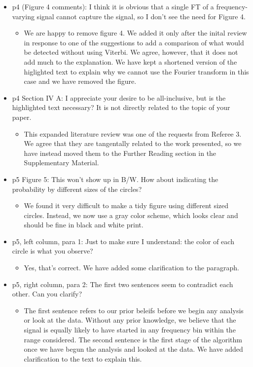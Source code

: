 \documentclass[a4paper, 10pt]{letter}
\begin{document}
\begin{itemize}
\item p4 (Figure 4 comments):  I think it is obvious that a single FT of a frequency-varying signal cannot capture the signal, so I don't see the need for Figure 4. 
\begin{itemize}
\item We are happy to remove figure 4. We added it only after the inital review in response to one of the suggestions to add a comparison of what would be detected without using Viterbi. We agree, however, that it does not add much to the explanation. We have kept a shortened version of the higlighted text to explain why we cannot use the Fourier transform in this case and we have removed the figure. 
\end{itemize}

\item p4 Section IV A: I appreciate your desire to be all-inclusive, but is the highlighted text necessary? It is not directly related to the topic of your paper. 
\begin{itemize}
\item This expanded literature review was one of the requests from Referee 3. We agree that they are tangentally related to the work presented, so we have instead moved them to the Further Reading section in the Supplementary Material. 
\end{itemize}

\item p5 Figure 5: This won't show up in B/W. How about indicating the probability by different sizes of the circles? 
\begin{itemize}
\item We found it very difficult to make a tidy figure using different sized circles. Instead, we now use a gray color scheme, which looks clear and should be fine in black and white print. 
\end{itemize}

\item p5, left column, para 1: Just to make sure I understand: the color of each circle is what you observe?
\begin{itemize}
\item Yes, that's correct. We have added some clarification to the paragraph.
\end{itemize}

\item p5, right column, para 2: The first two sentences seem to contradict each other. Can you clarify? 
\begin{itemize}
\item The first sentence refers to our prior beleifs before we begin any analysis or look at the data. Without any prior knowledge, we believe that the signal is equally likely to have started in any frequency bin within the range considered. The second sentence is the first stage of the algorithm once we have begun the analysis and looked at the data. We have added clarification to the text to explain this. 
\end{itemize}


\end{itemize}
\end{document}
